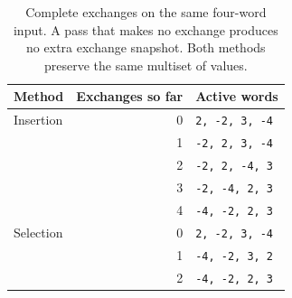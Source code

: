 \begin{table}[htbp]
  \centering
  \begin{tabular}{lrl}
    \toprule
    Method    & Exchanges so far & Active words          \\
    \midrule
    Insertion & 0                & \texttt{2, -2, 3, -4} \\
              & 1                & \texttt{-2, 2, 3, -4} \\
              & 2                & \texttt{-2, 2, -4, 3} \\
              & 3                & \texttt{-2, -4, 2, 3} \\
              & 4                & \texttt{-4, -2, 2, 3} \\
    \midrule
    Selection & 0                & \texttt{2, -2, 3, -4} \\
              & 1                & \texttt{-4, -2, 3, 2} \\
              & 2                & \texttt{-4, -2, 2, 3} \\
    \bottomrule
  \end{tabular}
  \caption{Complete exchanges on the same four-word input. A pass that makes no exchange produces no extra exchange snapshot. Both methods preserve the same multiset of values.}
  \label{tab:revision-sorting-exchanges}
\end{table}
